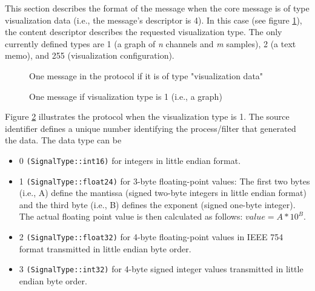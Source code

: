 \documentclass[letterpaper,oneside,12pt]{book}
\begin{document}
This section describes the format of the message when the core message is of 
type visualization data (i.e., the message's descriptor is 4). In this case (see 
figure \ref{visualizationprotocol}), the content descriptor describes the 
requested visualization type. The only currently defined types are 1 (a graph of 
\textit{n} channels and \textit{m} samples), 2 (a text memo), and 255 
(visualization configuration).

\begin{figure}[ht]
 \centerline{}
 \caption{One message in the protocol if it is of type "visualization data"}
 \label{visualizationprotocol}
\end{figure}

\begin{figure}[ht]
 \centerline{}
 \caption{One message if visualization type is 1 (i.e., a graph)}
 \label{visualizationprotocol_type1}
\end{figure}

Figure \ref{visualizationprotocol_type1} illustrates the protocol when the 
visualization type is 1. The source identifier defines a unique number 
identifying the process/filter that generated the data. The data type can be 
\begin{itemize}
\item 0 \texttt{(SignalType::int16)} for integers in little endian format.
\item 1 \texttt{(SignalType::float24)} for 3-byte floating-point values:
The first two bytes (i.e., A) define 
the mantissa (signed two-byte integers in little endian format) and the third 
byte (i.e., B) defines the exponent (signed one-byte integer). The actual floating 
point value is then calculated as follows: $value=A*10^{B}$.
\item 2 \texttt{(SignalType::float32)} for 4-byte floating-point values in IEEE 754 format transmitted in little endian byte order.
\item 3 \texttt{(SignalType::int32)} for 4-byte signed integer values transmitted in little endian byte order.
\end{itemize}
\end{document}
